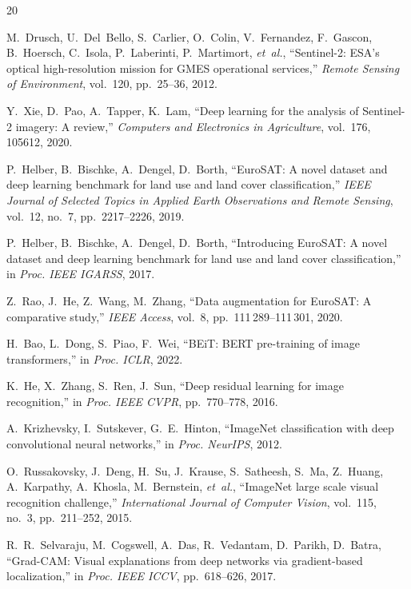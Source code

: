 \documentclass[conference]{IEEEtran}
\begin{document}
\begin{thebibliography}{20}

M.~Drusch, U.~Del~Bello, S.~Carlier, O.~Colin, V.~Fernandez, F.~Gascon,
B.~Hoersch, C.~Isola, P.~Laberinti, P.~Martimort, \emph{et~al.},
``Sentinel-2: ESA's optical high-resolution mission for GMES operational
services,'' \emph{Remote Sensing of Environment}, vol.~120, pp.~25--36,
2012.

Y.~Xie, D.~Pao, A.~Tapper, K.~Lam, ``Deep learning for the analysis of
Sentinel-2 imagery: A review,'' \emph{Computers and Electronics in
Agriculture}, vol.~176, 105612, 2020.

P.~Helber, B.~Bischke, A.~Dengel, D.~Borth, ``EuroSAT: A novel dataset
and deep learning benchmark for land use and land cover
classification,'' \emph{IEEE Journal of Selected Topics in Applied
Earth Observations and Remote Sensing}, vol.~12, no.~7, pp.~2217--2226,
2019.

P.~Helber, B.~Bischke, A.~Dengel, D.~Borth, ``Introducing EuroSAT: A
novel dataset and deep learning benchmark for land use and land cover
classification,'' in \emph{Proc. IEEE IGARSS}, 2017.

Z.~Rao, J.~He, Z.~Wang, M.~Zhang, ``Data augmentation for EuroSAT: A
comparative study,'' \emph{IEEE Access}, vol.~8, pp.~111\,289--111\,301,
2020.

H.~Bao, L.~Dong, S.~Piao, F.~Wei, ``BEiT: BERT pre-training of image
transformers,'' in \emph{Proc. ICLR}, 2022.

K.~He, X.~Zhang, S.~Ren, J.~Sun, ``Deep residual learning for image
recognition,'' in \emph{Proc. IEEE CVPR}, pp.~770--778, 2016.

A.~Krizhevsky, I.~Sutskever, G.~E.~Hinton, ``ImageNet classification with
deep convolutional neural networks,'' in \emph{Proc. NeurIPS}, 2012.

O.~Russakovsky, J.~Deng, H.~Su, J.~Krause, S.~Satheesh, S.~Ma, Z.~Huang,
A.~Karpathy, A.~Khosla, M.~Bernstein, \emph{et~al.},
``ImageNet large scale visual recognition challenge,''
\emph{International Journal of Computer Vision}, vol.~115, no.~3,
pp.~211--252, 2015.

R.~R.~Selvaraju, M.~Cogswell, A.~Das, R.~Vedantam, D.~Parikh, D.~Batra,
``Grad-CAM: Visual explanations from deep networks via gradient-based
localization,'' in \emph{Proc. IEEE ICCV}, pp.~618--626, 2017.


\end{thebibliography}
\end{document}
